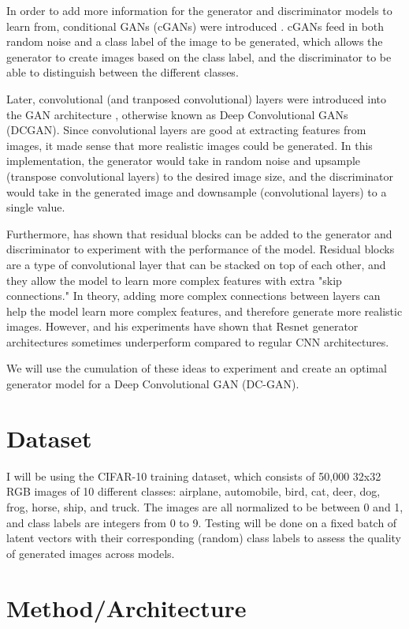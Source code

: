 \documentclass[twoside,11pt]{article}
\begin{document}
In order to add more information for the generator and discriminator models to learn from, conditional GANs (cGANs) were introduced \citet{mirza:14}. cGANs feed in both random noise and a class label of the image to be generated, which allows the generator to create images based on the class label, and the discriminator to be able to distinguish between the different classes.

Later, convolutional (and tranposed convolutional) layers were introduced into the GAN architecture \citet{radford:16}, otherwise known as Deep Convolutional GANs (DCGAN). Since convolutional layers are good at extracting features from images, it made sense that more realistic images could be generated. In this implementation, the generator would take in random noise and upsample (transpose convolutional layers) to the desired image size, and the discriminator would take in the generated image and downsample (convolutional layers) to a single value.

Furthermore, \citet{hyland:17} has shown that residual blocks can be added to the generator and discriminator to experiment with the performance of the model. Residual blocks are a type of convolutional layer that can be stacked on top of each other, and they allow the model to learn more complex features with extra "skip connections." In theory, adding more complex connections between layers can help the model learn more complex features, and therefore generate more realistic images. However, \citet{he:21} and his experiments have shown that Resnet generator architectures sometimes underperform compared to regular CNN architectures.

We will use the cumulation of these ideas to experiment and create an optimal generator model for a Deep Convolutional GAN (DC-GAN).

\section{Dataset}

I will be using the CIFAR-10 training dataset, which consists of 50,000 32x32 RGB images of 10 different classes: airplane, automobile, bird, cat, deer, dog, frog, horse, ship, and truck. The images are all normalized to be between 0 and 1, and class labels are integers from 0 to 9. Testing will be done on a fixed batch of latent vectors with their corresponding (random) class labels to assess the quality of generated images across models.

\section{Method/Architecture}
\end{document}
